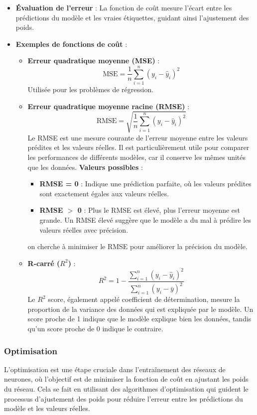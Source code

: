 \begin{itemize}
	\item \textbf{Évaluation de l'erreur} : La fonction de coût mesure l'écart entre les prédictions du modèle et les vraies étiquettes, guidant ainsi l'ajustement des poids.
	\item \textbf{Exemples de fonctions de coût} :
	\begin{itemize}
		\item \textbf{Erreur quadratique moyenne (MSE)} : 
		\[
		\text{MSE} = \frac{1}{n} \sum_{i=1}^{n} (y_i - \hat{y}_i)^2
		\]
		Utilisée pour les problèmes de régression.
		\item \textbf{Erreur quadratique moyenne racine (RMSE)} : 
		\[
		\text{RMSE} = \sqrt{\frac{1}{n} \sum_{i=1}^{n} (y_i - \hat{y}_i)^2}
		\]
		Le RMSE est une mesure courante de l'erreur moyenne entre les valeurs prédites et les valeurs réelles. Il est particulièrement utile pour comparer les performances de différents modèles, car il conserve les mêmes unités que les données.
		\textbf{Valeurs possibles} : 
		\begin{itemize}
			\item \textbf{RMSE = 0} : Indique une prédiction parfaite, où les valeurs prédites sont exactement égales aux valeurs réelles.
			\item \textbf{RMSE $>$ 0} : Plus le RMSE est élevé, plus l'erreur moyenne est grande. Un RMSE élevé suggère que le modèle a du mal à prédire les valeurs réelles avec précision.
		\end{itemize}
	on cherche à minimiser le RMSE pour améliorer la précision du modèle.
		\item \textbf{R-carré (\( R^2 \))} : 
		\[
		R^2 = 1 - \frac{\sum_{i=1}^{n} (y_i - \hat{y}_i)^2}{\sum_{i=1}^{n} (y_i - \bar{y})^2}
		\]
		Le \( R^2 \) score, également appelé coefficient de détermination, mesure la proportion de la variance des données qui est expliquée par le modèle. Un score proche de 1 indique que le modèle explique bien les données, tandis qu'un score proche de 0 indique le contraire.
	\end{itemize}
\end{itemize}

\subsubsection{Optimisation}

L'optimisation est une étape cruciale dans l'entraînement des réseaux de neurones, où l'objectif est de minimiser la fonction de coût en ajustant les poids du réseau. Cela se fait en utilisant des algorithmes d'optimisation qui guident le processus d'ajustement des poids pour réduire l'erreur entre les prédictions du modèle et les valeurs réelles.

